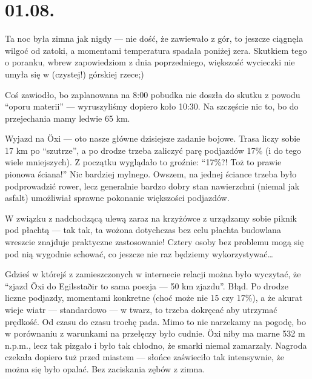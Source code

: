 \chapter*{01.08.}

Ta noc była zimna jak nigdy --- nie dość, że zawiewało z gór, to jeszcze ciągnęła wilgoć od zatoki, a momentami temperatura spadała poniżej zera. Skutkiem tego o poranku, wbrew zapowiedziom z dnia poprzedniego, większość wycieczki nie umyła się w (czystej!) górskiej rzece;)


Coś zawiodło, bo zaplanowana na 8:00 pobudka nie doszła do skutku z powodu “oporu materii” --- wyruszyliśmy dopiero koło 10:30. Na szczęście nic to, bo do przejechania mamy ledwie 65 km.

Wyjazd na Öxi --- oto nasze główne dzisiejsze zadanie bojowe. Trasa liczy sobie 17 km po “szutrze”, a po drodze trzeba zaliczyć parę podjazdów 17\% (i do tego wiele mniejszych). Z początku wyglądało to groźnie: “17\%?! Toż to prawie pionowa ściana!” Nic bardziej mylnego. Owszem, na jednej ściance trzeba było podprowadzić rower, lecz generalnie bardzo dobry stan nawierzchni (niemal jak asfalt) umożliwiał sprawne pokonanie większości podjazdów.


W związku z nadchodzącą ulewą zaraz na krzyżówce z  urządzamy sobie piknik pod płachtą --- tak tak, ta wożona dotychczas bez celu płachta budowlana wreszcie znajduje praktyczne zastosowanie! Cztery osoby bez problemu mogą się pod nią wygodnie schować, co jeszcze nie raz będziemy wykorzystywać…

Gdzieś w którejś z zamieszczonych w internecie relacji można było wyczytać, że “zjazd Öxi do Egilsstaðir to sama poezja --- 50 km zjazdu”. Błąd. Po drodze liczne podjazdy, momentami konkretne (choć może nie 15 czy 17\%), a że akurat wieje wiatr --- standardowo --- w twarz, to trzeba dokręcać aby utrzymać prędkość. Od czasu do czasu trochę pada. Mimo to nie narzekamy na pogodę, bo w porównaniu z warunkami na przełęczy było cudnie. Öxi niby ma marne 532 m n.p.m., lecz tak pizgało i było tak chłodno, że smarki niemal zamarzały. Nagroda czekała dopiero tuż przed miastem --- słońce zaświeciło tak intensywnie, że można się było opalać. Bez zaciskania zębów z zimna.

